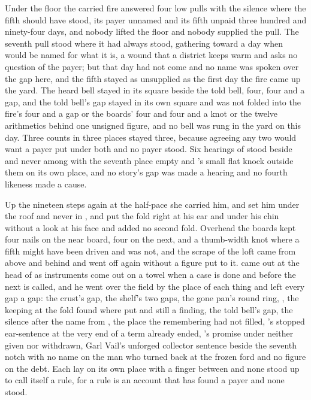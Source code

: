 Under the floor the carried fire answered four low pulls with the silence where the fifth should have stood, its payer unnamed and its fifth unpaid three hundred and ninety-four days, and nobody lifted the floor and nobody supplied the pull. The seventh pull stood where it had always stood, gathering toward a day when  would be named for what it is, a wound that a district keeps warm and asks no question of the payer; but that day had not come and no name was spoken over the gap here, and the fifth stayed as unsupplied as the first day the fire came up the yard. The heard bell stayed in its square beside the told bell, four, four and a gap, and the told bell's gap stayed in its own square and was not folded into the fire's four and a gap or the boards' four and four and a knot or the twelve arithmetics behind one unsigned figure, and no bell was rung in the yard on this day. Three counts in three places stayed three, because agreeing any two would want a payer put under both and no payer stood. Six hearings of  stood beside and never among with the seventh place empty and 's small flat knock outside them on its own place, and no story's gap was made a hearing and no fourth likeness made a cause.

Up the nineteen steps again at the half-pace she carried him, and set him under the roof and never in , and put the fold right at his ear and under his chin without a look at his face and added no second fold. Overhead the boards kept four nails on the near board, four on the next, and a thumb-width knot where a fifth might have been driven and was not, and the scrape of the loft came from above and behind and went off again without a figure put to it.  came out at the head of  as instruments come out on a towel when a case is done and before the next is called, and he went over the field by the place of each thing and left every gap a gap: the crust's gap, the shelf's two gaps, the gone pan's round ring, , the keeping at the fold found where put and still a finding, the told bell's gap, the silence after the name from , the place the remembering had not filled, 's stopped ear-sentence at the very end of a term already ended, 's promise under  neither given nor withdrawn, Garl Vail's unforged collector sentence beside the seventh notch with no name on the man who turned back at the frozen ford and no figure on the debt. Each lay on its own place with a finger between and none stood up to call itself a rule, for a rule is an account that has found a payer and none stood.

